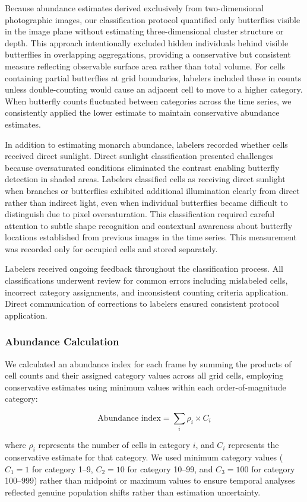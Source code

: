 Because abundance estimates derived exclusively from two-dimensional photographic images, our classification protocol quantified only butterflies visible in the image plane without estimating three-dimensional cluster structure or depth. This approach intentionally excluded hidden individuals behind visible butterflies in overlapping aggregations, providing a conservative but consistent measure reflecting observable surface area rather than total volume. For cells containing partial butterflies at grid boundaries, labelers included these in counts unless double-counting would cause an adjacent cell to move to a higher category. When butterfly counts fluctuated between categories across the time series, we consistently applied the lower estimate to maintain conservative abundance estimates.

In addition to estimating monarch abundance, labelers recorded whether cells received direct sunlight. Direct sunlight classification presented challenges because oversaturated conditions eliminated the contrast enabling butterfly detection in shaded areas. Labelers classified cells as receiving direct sunlight when branches or butterflies exhibited additional illumination clearly from direct rather than indirect light, even when individual butterflies became difficult to distinguish due to pixel oversaturation. This classification required careful attention to subtle shape recognition and contextual awareness about butterfly locations established from previous images in the time series. This measurement was recorded only for occupied cells and stored separately.

Labelers received ongoing feedback throughout the classification process. All classifications underwent review for common errors including mislabeled cells, incorrect category assignments, and inconsistent counting criteria application. Direct communication of corrections to labelers ensured consistent protocol application.

\subsubsection{Abundance Calculation}

We calculated an abundance index for each frame by summing the products of cell counts and their assigned category values across all grid cells, employing conservative estimates using minimum values within each order-of-magnitude category:

\begin{equation}
\text{Abundance index} = \sum_{i} \rho_i \times C_i
\end{equation}

where $\rho_i$ represents the number of cells in category $i$, and $C_i$ represents the conservative estimate for that category. We used minimum category values ($C_1 = 1$ for category 1–9, $C_2 = 10$ for category 10–99, and $C_3 = 100$ for category 100–999) rather than midpoint or maximum values to ensure temporal analyses reflected genuine population shifts rather than estimation uncertainty.